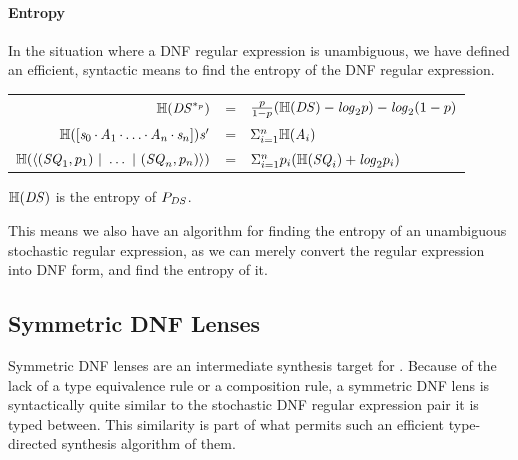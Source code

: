 \documentclass[acmsmall,screen,anonymous]{acmart}
\begin{document}
\paragraph*{Entropy}
In the situation where a DNF regular expression is
unambiguous, we have defined an efficient, syntactic means to find the entropy
of the DNF regular expression.
\begin{center}
  \begin{tabular}{rcl}
    $\mathbb{H}(\mathit{DS}^{*_{p}})$
    & =
    & $\frac{p}{1-p}(\mathbb{H}(\mathit{DS}) - \mathit{log}_2p)
      - \mathit{log}_2(1-p)
      $\\
    
    $\mathbb{H}([\mathit{s}_0 \mkern-1mu\cdot\mkern-1mu \mathit{A}_1 \mkern-1mu\cdot\mkern-1mu \ldots \mkern-1mu\cdot\mkern-1mu \mathit{A}_n \mkern-1mu\cdot\mkern-1mu \mathit{s}_n]){\mathit{s}'}$
    & =
    & $\Sigma_{i = 1}^n\mathbb{H}(\mathit{A}_i)$ \\
    
    $\mathbb{H}(\langle(\mathit{SQ}_1,p_1) ~|~ \ldots ~|~ (\mathit{SQ}_n,p_n)\rangle)$
    & =
    & $\Sigma_{i=1}^np_i(\mathbb{H}(\mathit{SQ}_i)+\mathit{log}_2p_i)$\\
  \end{tabular}
\end{center}

\begin{theorem}
  $\mathbb{H}(\mathit{DS})$ is the entropy of $P_{\mathit{DS}}$.
\end{theorem}

This means we also have an algorithm for finding the entropy of an unambiguous
stochastic regular expression, as we can merely convert the regular expression
into DNF form, and find the entropy of it.


\subsection{Symmetric DNF Lenses}
Symmetric DNF lenses are an intermediate synthesis target for \GreedySynth.
Because of the lack of a type equivalence rule or a composition rule, a
symmetric DNF lens is syntactically quite similar to the stochastic DNF regular
expression pair it is typed between. This similarity is part of what permits
such an efficient type-directed synthesis algorithm of them.
\end{document}
